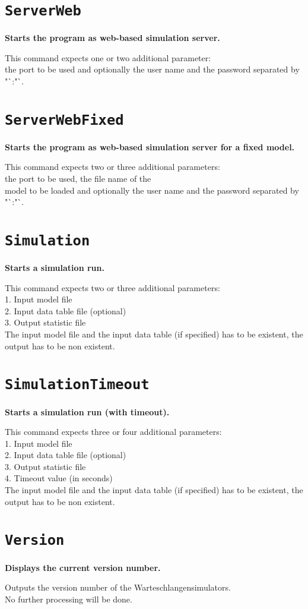 \section{\texttt{ServerWeb}}

\textbf{Starts the program as web-based simulation server.}

This command expects one or two additional parameter:\\
the port to be used and optionally the user name and the password separated by "`:"`.

\section{\texttt{ServerWebFixed}}

\textbf{Starts the program as web-based simulation server for a fixed model.}

This command expects two or three additional parameters:\\
the port to be used, the file name of the\\
model to be loaded and optionally the user name and the password separated by "`:"`.

\section{\texttt{Simulation}}

\textbf{Starts a simulation run.}

This command expects two or three additional parameters:\\
1. Input model file\\
2. Input data table file (optional)\\
3. Output statistic file\\
The input model file and the input data table (if specified) has to be existent, the output has to be non existent.

\section{\texttt{SimulationTimeout}}

\textbf{Starts a simulation run (with timeout).}

This command expects three or four additional parameters:\\
1. Input model file\\
2. Input data table file (optional)\\
3. Output statistic file\\
4. Timeout value (in seconds)\\
The input model file and the input data table (if specified) has to be existent, the output has to be non existent.

\section{\texttt{Version}}

\textbf{Displays the current version number.}

Outputs the version number of the Warteschlangensimulators.\\
No further processing will be done.

